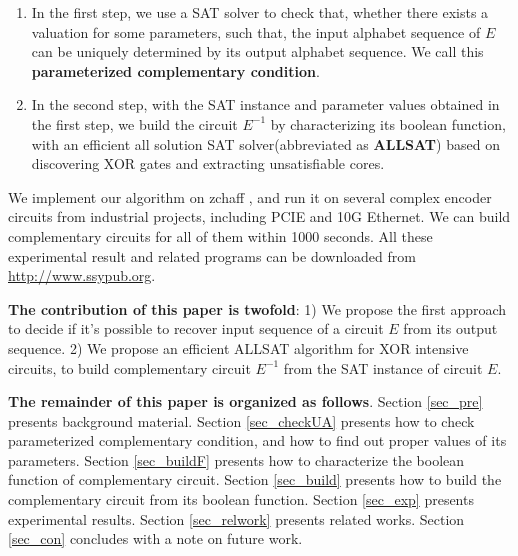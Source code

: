 \documentclass[journal]{IEEEtran}
\begin{document}
\begin{enumerate}
  \item In the first step, we use a SAT solver to check that,
        whether there exists a valuation for some parameters,
        such that,
	the input alphabet sequence of $E$ can be uniquely determined by its output alphabet sequence.
	We call this \textbf{parameterized complementary condition}.
  \item In the second step,
        with the SAT instance and parameter values obtained in the first step,
	we build the circuit $E^{-1}$ by characterizing its boolean function,
with an efficient all solution SAT solver(abbreviated as \textbf{ALLSAT}) based on discovering XOR gates and extracting unsatisfiable cores.
\end{enumerate}

We implement our algorithm on zchaff \cite{CHAFF},
and run it on several complex encoder circuits from industrial projects,
including PCIE and 10G Ethernet.
We can build complementary circuits for all of them within 1000 seconds.
All these experimental result and related programs can be downloaded from \url{http://www.ssypub.org}.

\textbf{The contribution of this paper is twofold}:
1) We propose the first approach to decide if it's possible to recover input sequence of a circuit $E$ from its output sequence.
2) We propose an efficient ALLSAT algorithm for XOR intensive circuits,
to build complementary circuit $E^{-1}$ from the SAT instance of circuit $E$.

\textbf{The remainder of this paper is organized as follows}.
Section \ref{sec_pre} presents background material.
Section \ref{sec_checkUA} presents how to check parameterized complementary condition,
and how to find out proper values of its parameters.
Section \ref{sec_buildF} presents how to characterize the boolean function of complementary circuit.
Section \ref{sec_build} presents how to build the complementary circuit from its boolean function.
Section \ref{sec_exp} presents experimental results.
Section \ref{sec_relwork} presents related works.
Section \ref{sec_con} concludes with a note on future work.

\end{document}

